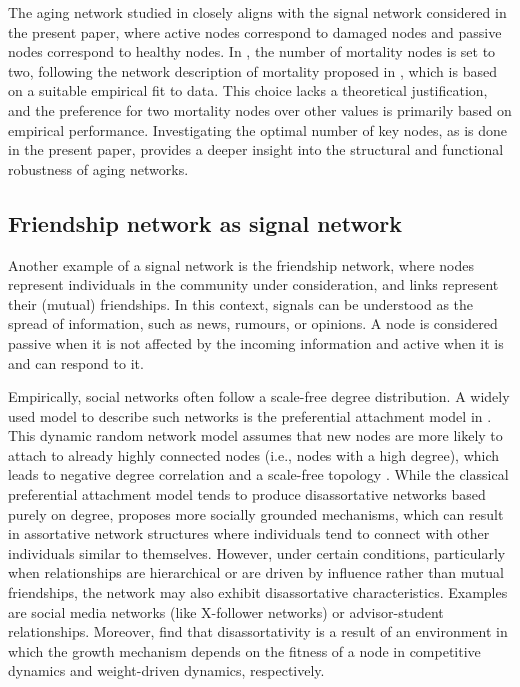 \documentclass[11pt]{article}
\numberwithin{equation}{section}
\begin{document}
The aging network studied in \cite{Aging} closely aligns with the signal network considered in the present paper, where active nodes correspond to damaged nodes and passive nodes correspond to healthy nodes. In \cite{Aging}, the number of mortality nodes is set to two, following the network description of mortality proposed in \cite{MRFR2017}, which is based on a suitable empirical fit to data. This choice lacks a theoretical justification, and the preference for two mortality nodes over other values is primarily based on empirical performance. Investigating the optimal number of key nodes, as is done in the present paper, provides a deeper insight into the structural and functional robustness of aging networks.

\subsection{Friendship network as signal network}
\label{ss.FN}

Another example of a signal network is the friendship network, where nodes represent individuals in the community under consideration, and links represent their (mutual) friendships. In this context, signals can be understood as the spread of information, such as news, rumours, or opinions. A node is considered passive when it is not affected by the incoming information and active when it is and can respond to it.

Empirically, social networks often follow a scale-free degree distribution. A widely used model to describe such networks is the preferential attachment model in \cite{BA1999}. This dynamic random network model assumes that new nodes are more likely to attach to already highly connected nodes (i.e., nodes with a high degree), which leads to negative degree correlation and a scale-free topology \cite{BA1999}. While the classical preferential attachment model tends to produce disassortative networks based purely on degree, \cite{Jackson} proposes more socially grounded mechanisms, which can result in assortative network structures where individuals tend to connect with other individuals similar to themselves. However, under certain conditions, particularly when relationships are hierarchical or are driven by influence rather than mutual friendships, the network may also exhibit disassortative characteristics. Examples are social media networks (like X-follower networks) or advisor-student relationships. Moreover, \cite{PSVV, BBV} find that disassortativity is a result of an environment in which the growth mechanism depends on the fitness of a node in competitive dynamics and weight-driven dynamics, respectively. 
\end{document}
